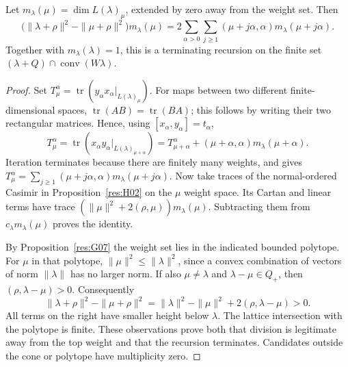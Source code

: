 \begin{theorem}
\label{res:H05}
Let \(m_\lambda(\mu)=\dim L(\lambda)_\mu\), extended by zero
away from the weight set. Then
\[
 \bigl(\|\lambda+\rho\|^2-\|\mu+\rho\|^2\bigr)m_\lambda(\mu)
 =2\sum_{\alpha>0}\sum_{j\geq1}
        (\mu+j\alpha,\alpha)m_\lambda(\mu+j\alpha).
\]
Together with \(m_\lambda(\lambda)=1\), this is a terminating
recursion on the finite set
\((\lambda+Q)\cap\operatorname{conv}(W\lambda)\).
\end{theorem}
\begin{proof}
Set \(T_\mu^\alpha=\operatorname{tr}
(y_\alpha x_\alpha|_{L(\lambda)_\mu})\).
For maps between two different finite-dimensional spaces,
\(\operatorname{tr}(AB)=\operatorname{tr}(BA)\);
this follows by writing their two rectangular matrices.
Hence, using \([x_\alpha,y_\alpha]=t_\alpha\),
\[
 T_\mu^\alpha
   =\operatorname{tr}(x_\alpha y_\alpha|_{L(\lambda)_{\mu+\alpha}})
   =T_{\mu+\alpha}^\alpha+
                 (\mu+\alpha,\alpha)m_\lambda(\mu+\alpha).
\]
Iteration terminates because there are finitely many weights,
and gives
\(T_\mu^\alpha=\sum_{j\geq1}
(\mu+j\alpha,\alpha)m_\lambda(\mu+j\alpha)\).
Now take traces of the normal-ordered Casimir in
Proposition~\ref{res:H02} on the \(\mu\) weight space.
Its Cartan and linear terms have trace
\((\|\mu\|^2+2(\rho,\mu))m_\lambda(\mu)\).
Subtracting them from \(c_\lambda m_\lambda(\mu)\)
proves the identity.

By Proposition~\ref{res:G07} the weight set lies in the indicated
bounded polytope. For \(\mu\) in that polytope,
\(\|\mu\|^2\leq\|\lambda\|^2\), since a convex combination of
vectors of norm \(\|\lambda\|\) has no larger norm.
If also \(\mu\ne\lambda\) and \(\lambda-\mu\in Q_+\), then
\((\rho,\lambda-\mu)>0\). Consequently
\[
 \|\lambda+\rho\|^2-\|\mu+\rho\|^2
 =\|\lambda\|^2-\|\mu\|^2+2(\rho,\lambda-\mu)>0.
\]
All terms on the right have smaller height below \(\lambda\).
The lattice intersection with the polytope is finite. These
observations prove both that division is legitimate away from
the top weight and that the recursion terminates. Candidates
outside the cone or polytope have multiplicity zero.
\end{proof}

